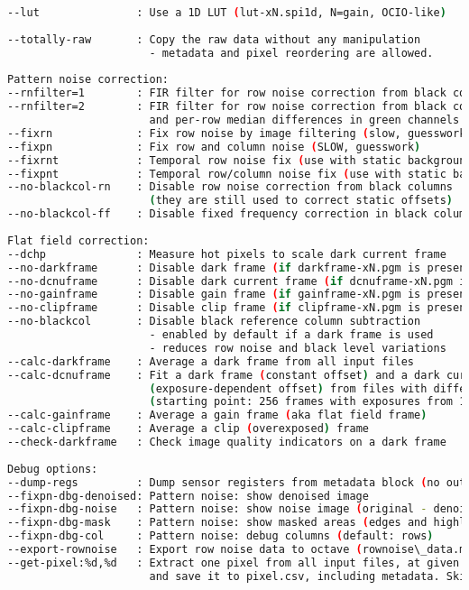 \begin{lstlisting}[language=bash,morekeywords=$,keywordstyle=\bfseries,frame=none,xleftmargin=.25in,belowskip=2em, aboveskip=2em]
--lut               : Use a 1D LUT (lut-xN.spi1d, N=gain, OCIO-like)
 
--totally-raw       : Copy the raw data without any manipulation
                      - metadata and pixel reordering are allowed.
 
Pattern noise correction:
--rnfilter=1        : FIR filter for row noise correction from black columns
--rnfilter=2        : FIR filter for row noise correction from black columns
                      and per-row median differences in green channels
--fixrn             : Fix row noise by image filtering (slow, guesswork)
--fixpn             : Fix row and column noise (SLOW, guesswork)
--fixrnt            : Temporal row noise fix (use with static backgrounds; recommended)
--fixpnt            : Temporal row/column noise fix (use with static backgrounds)
--no-blackcol-rn    : Disable row noise correction from black columns
                      (they are still used to correct static offsets)
--no-blackcol-ff    : Disable fixed frequency correction in black columns
 
Flat field correction:
--dchp              : Measure hot pixels to scale dark current frame
--no-darkframe      : Disable dark frame (if darkframe-xN.pgm is present)
--no-dcnuframe      : Disable dark current frame (if dcnuframe-xN.pgm is present)
--no-gainframe      : Disable gain frame (if gainframe-xN.pgm is present)
--no-clipframe      : Disable clip frame (if clipframe-xN.pgm is present)
--no-blackcol       : Disable black reference column subtraction
                      - enabled by default if a dark frame is used
                      - reduces row noise and black level variations
--calc-darkframe    : Average a dark frame from all input files
--calc-dcnuframe    : Fit a dark frame (constant offset) and a dark current frame
                      (exposure-dependent offset) from files with different exposures
                      (starting point: 256 frames with exposures from 1 to 50 ms)
--calc-gainframe    : Average a gain frame (aka flat field frame)
--calc-clipframe    : Average a clip (overexposed) frame
--check-darkframe   : Check image quality indicators on a dark frame
 
Debug options:
--dump-regs         : Dump sensor registers from metadata block (no output DNG)
--fixpn-dbg-denoised: Pattern noise: show denoised image
--fixpn-dbg-noise   : Pattern noise: show noise image (original - denoised)
--fixpn-dbg-mask    : Pattern noise: show masked areas (edges and highlights)
--fixpn-dbg-col     : Pattern noise: debug columns (default: rows)
--export-rownoise   : Export row noise data to octave (rownoise\_data.m)
--get-pixel:%d,%d   : Extract one pixel from all input files, at given coordinates,
                      and save it to pixel.csv, including metadata. Skips DNG output.
\end{lstlisting}
                       
